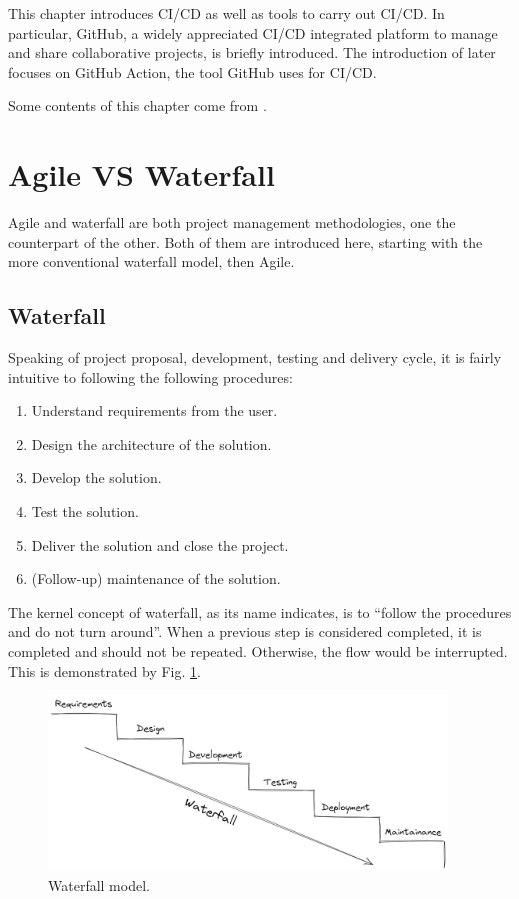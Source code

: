 This chapter introduces CI/CD as well as tools to carry out CI/CD. In particular, GitHub, a widely appreciated CI/CD integrated platform to manage and share collaborative projects, is briefly introduced. The introduction of later focuses on GitHub Action, the tool GitHub uses for CI/CD.

Some contents of this chapter come from \cite{honai2023cicd}.

\section{Agile VS Waterfall}

Agile and waterfall are both project management methodologies, one the counterpart of the other. Both of them are introduced here, starting with the more conventional waterfall model, then Agile.

\subsection{Waterfall}

Speaking of project proposal, development, testing and delivery cycle, it is fairly intuitive to following the following procedures:
\begin{enumerate}
	\item Understand requirements from the user.
	\item Design the architecture of the solution.
	\item Develop the solution.
	\item Test the solution.
	\item Deliver the solution and close the project.
	\item (Follow-up) maintenance of the solution.
\end{enumerate}
The kernel concept of waterfall, as its name indicates, is to ``follow the procedures and do not turn around''. When a previous step is considered completed, it is completed and should not be repeated. Otherwise, the flow would be interrupted. This is demonstrated by Fig. \ref{ch:cicd:fig:waterfall}.

\begin{figure}
	\centering
	\includegraphics[width=300pt]{chapters/ap/figures/waterfall.png}
	\caption{Waterfall model.} \label{ch:cicd:fig:waterfall}
\end{figure}

